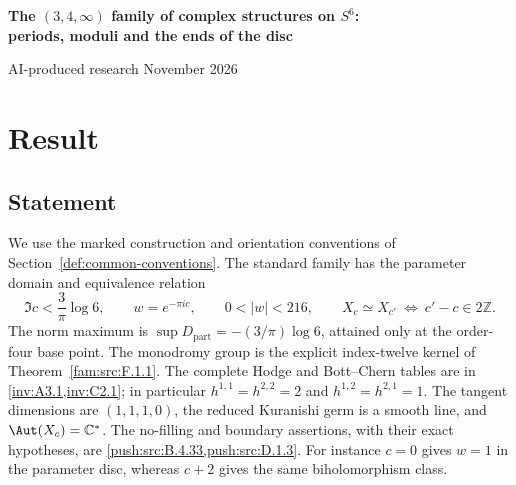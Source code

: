 \begin{center}
{\Large\bfseries The $(3,4,\infty)$ family of complex structures on $S^6$:\\periods, moduli and the ends of the disc\par}
\medskip
{\small AI-produced research November 2026\par}
\end{center}
\begin{abstract}
For the standard marked $(3,4,\infty)$ family, the admissible parameter is
$0<|w|<216$, where $w=\exp(-\pi i c)$, and $X_c\simeq X_{c'}$ exactly when
$c'-c\in2\mathbb Z$. We determine its normalized periods, sharp norm bound,
integral monodromy, cohomology, real forms, special fibres and arithmetic
specializations. The specified affine family has no proper analytic filling
at zero after any finite parameter cover; the circle $|w|=216$ is a natural
boundary for proper flat extensions. The construction is credited to Claude
and Alp\"oge and to Engel; the standard classification, tangent cohomology,
Kuranishi germ and automorphisms are credited to Du, Guo, Kusakabe and Xie,
version 1. Complete independent derivations accompany the period, integral,
analytic and arithmetic calculations. This writing and its proof comparisons
are AI-produced by GPT-6 Astra (OpenAI, ChatGPT Pro mode, effort Pro),
17 November 2026; the verification record distinguishes complete readings,
source checks and rerun certificates. No human has checked the mathematics.
A literal global coefficient atlas and an unconditional transcendence claim
remain in a separate final part.
\end{abstract}

\section{Result}
\subsection{Statement}
We use the marked construction and orientation conventions of
Section~\ref{def:common-conventions}. The standard family has the parameter
domain and equivalence relation
\[
 \Im c<\frac{3}{\pi}\log6,\qquad
 w=e^{-\pi i c},\qquad 0<|w|<216,\qquad
 X_c\simeq X_{c'}\ \Longleftrightarrow\ c'-c\in2\mathbb Z.
\]
The norm maximum is $\sup D_{\mathrm{part}}=-(3/\pi)\log6$, attained only
at the order-four base point. The monodromy group is the explicit index-twelve
kernel of Theorem~\ref{fam:src:F.1.1}. The complete Hodge and Bott--Chern
tables are in \cref{inv:A3.1,inv:C2.1}; in particular
$h^{1,1}=h^{2,2}=2$ and $h^{1,2}=h^{2,1}=1$.
The tangent dimensions are $(1,1,1,0)$, the reduced Kuranishi germ is a
smooth line, and $\Aut(X_c)=\mathbb C^*$.
The no-filling and boundary assertions, with their exact hypotheses, are
\cref{push:src:B.4.33,push:src:D.1.3}.
For instance $c=0$ gives $w=1$ in the parameter disc, whereas $c+2$ gives
the same biholomorphism class.

